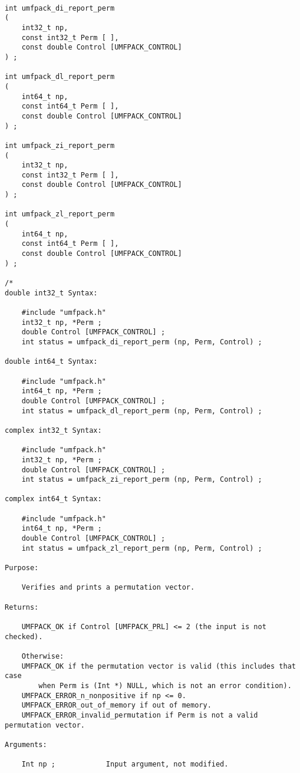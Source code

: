 \documentclass[11pt]{article}
\begin{document}
{\footnotesize
\begin{verbatim}

int umfpack_di_report_perm
(
    int32_t np,
    const int32_t Perm [ ],
    const double Control [UMFPACK_CONTROL]
) ;

int umfpack_dl_report_perm
(
    int64_t np,
    const int64_t Perm [ ],
    const double Control [UMFPACK_CONTROL]
) ;

int umfpack_zi_report_perm
(
    int32_t np,
    const int32_t Perm [ ],
    const double Control [UMFPACK_CONTROL]
) ;

int umfpack_zl_report_perm
(
    int64_t np,
    const int64_t Perm [ ],
    const double Control [UMFPACK_CONTROL]
) ;

/*
double int32_t Syntax:

    #include "umfpack.h"
    int32_t np, *Perm ;
    double Control [UMFPACK_CONTROL] ;
    int status = umfpack_di_report_perm (np, Perm, Control) ;

double int64_t Syntax:

    #include "umfpack.h"
    int64_t np, *Perm ;
    double Control [UMFPACK_CONTROL] ;
    int status = umfpack_dl_report_perm (np, Perm, Control) ;

complex int32_t Syntax:

    #include "umfpack.h"
    int32_t np, *Perm ;
    double Control [UMFPACK_CONTROL] ;
    int status = umfpack_zi_report_perm (np, Perm, Control) ;

complex int64_t Syntax:

    #include "umfpack.h"
    int64_t np, *Perm ;
    double Control [UMFPACK_CONTROL] ;
    int status = umfpack_zl_report_perm (np, Perm, Control) ;

Purpose:

    Verifies and prints a permutation vector.

Returns:

    UMFPACK_OK if Control [UMFPACK_PRL] <= 2 (the input is not checked).

    Otherwise:
    UMFPACK_OK if the permutation vector is valid (this includes that case
        when Perm is (Int *) NULL, which is not an error condition).
    UMFPACK_ERROR_n_nonpositive if np <= 0.
    UMFPACK_ERROR_out_of_memory if out of memory.
    UMFPACK_ERROR_invalid_permutation if Perm is not a valid permutation vector.

Arguments:

    Int np ;            Input argument, not modified.


\end{verbatim}}
\end{document}
